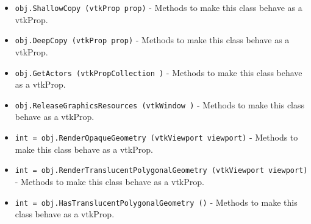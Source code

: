 \begin{itemize}
\item  \verb|obj.ShallowCopy (vtkProp prop)| -  Methods to make this class behave as a vtkProp.

\item  \verb|obj.DeepCopy (vtkProp prop)| -  Methods to make this class behave as a vtkProp.

\item  \verb|obj.GetActors (vtkPropCollection )| -  Methods to make this class behave as a vtkProp.

\item  \verb|obj.ReleaseGraphicsResources (vtkWindow )| -  Methods to make this class behave as a vtkProp.

\item  \verb|int = obj.RenderOpaqueGeometry (vtkViewport viewport)| -  Methods to make this class behave as a vtkProp.

\item  \verb|int = obj.RenderTranslucentPolygonalGeometry (vtkViewport viewport)| -  Methods to make this class behave as a vtkProp.

\item  \verb|int = obj.HasTranslucentPolygonalGeometry ()| -  Methods to make this class behave as a vtkProp.

\end{itemize}
